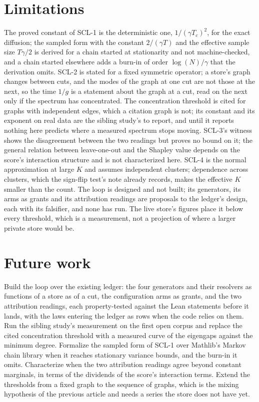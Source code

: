 \documentclass[11pt,a4paper]{article}
\theoremstyle{plain}
\theoremstyle{definition}
\theoremstyle{remark}
\begin{document}
\section{Limitations}

The proved constant of SCL-1 is the deterministic one, $1/(\gamma T_c)^2$, for the exact diffusion;
the sampled form with the constant $2/(\gamma T)$ and the effective sample size $T\gamma/2$ is derived
for a chain started at stationarity and not machine-checked, and a chain started elsewhere adds a
burn-in of order $\log(N)/\gamma$ that the derivation omits. SCL-2 is stated for a fixed symmetric
operator; a store's graph changes between cuts, and the modes of the graph at one cut are not those
at the next, so the time $1/g$ is a statement about the graph at a cut, read on the next only if the
spectrum has concentrated. The concentration threshold is cited for graphs with independent edges,
which a citation graph is not; its constant and its exponent on real data are the sibling study's to
report, and until it reports nothing here predicts where a measured spectrum stops moving. SCL-3's
witness shows the disagreement between the two readings but proves no bound on it; the general
relation between leave-one-out and the Shapley value depends on the score's interaction structure
and is not characterized here. SCL-4 is the normal approximation at large $K$ and assumes
independent clusters; dependence across clusters, which the sign-flip test's note already records,
makes the effective $K$ smaller than the count. The loop is designed and not built; its generators,
its arms as grants and its attribution readings are proposals to the ledger's design, each with its
falsifier, and none has run. The live store's figures place it below every threshold, which is a
measurement, not a projection of where a larger private store would be.

\section{Future work}

Build the loop over the existing ledger: the four generators and their resolvers as functions of a
store as of a cut, the configuration arms as grants, and the two attribution readings, each
property-tested against the Lean statements before it lands, with the laws entering the ledger as
rows when the code relies on them. Run the sibling study's measurement on the first open corpus and
replace the cited concentration threshold with a measured curve of the eigengaps against the
minimum degree. Formalize the sampled form of SCL-1 over Mathlib's Markov chain library when it
reaches stationary variance bounds, and the burn-in it omits. Characterize when the two attribution
readings agree beyond constant marginals, in terms of the dividends of the score's interaction
terms. Extend the thresholds from a fixed graph to the sequence of graphs, which is the mixing
hypothesis of the previous article and needs a series the store does not have yet.
\end{document}
